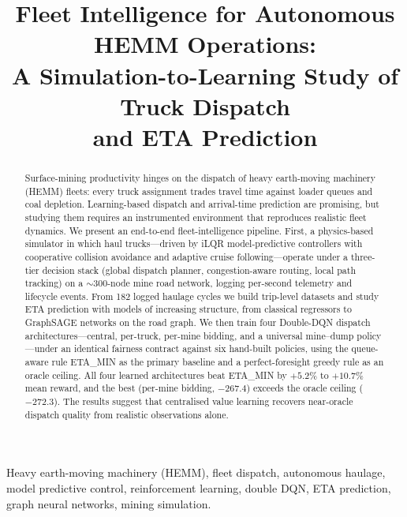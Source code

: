 \documentclass[conference]{IEEEtran}
\title{Fleet Intelligence for Autonomous HEMM Operations:\\
A Simulation-to-Learning Study of Truck Dispatch\\and ETA Prediction}
\author{
\IEEEauthorblockN{Author One\IEEEauthorrefmark{1}, Author Two\IEEEauthorrefmark{2}, Author Three\IEEEauthorrefmark{3}}
\IEEEauthorblockA{\IEEEauthorrefmark{1}Department / Institute, email@example.com}
\IEEEauthorblockA{\IEEEauthorrefmark{2}Department / Institute, email@example.com}
\IEEEauthorblockA{\IEEEauthorrefmark{3}Department / Institute, email@example.com}
}
\begin{document}
\maketitle

\begin{abstract}
Surface-mining productivity hinges on the dispatch of heavy earth-moving
machinery (HEMM) fleets: every truck assignment trades travel time against
loader queues and coal depletion. Learning-based dispatch and arrival-time
prediction are promising, but studying them requires an instrumented
environment that reproduces realistic fleet dynamics. We present an
end-to-end fleet-intelligence pipeline. First, a physics-based simulator in
which haul trucks---driven by iLQR model-predictive controllers with
cooperative collision avoidance and adaptive cruise following---operate
under a three-tier decision stack (global dispatch planner,
congestion-aware routing, local path tracking) on a $\sim$300-node mine
road network, logging per-second telemetry and lifecycle events. From 182
logged haulage cycles we build trip-level datasets and study ETA prediction
with models of increasing structure, from classical regressors to
GraphSAGE networks on the road graph. We then train four Double-DQN
dispatch architectures---central, per-truck, per-mine bidding, and a
universal mine--dump policy---under an identical fairness contract against
six hand-built policies, using the queue-aware rule ETA\_MIN as the primary
baseline and a perfect-foresight greedy rule as an oracle ceiling. All four
learned architectures beat ETA\_MIN by $+5.2\%$ to $+10.7\%$ mean reward,
and the best (per-mine bidding, $-267.4$) exceeds the oracle ceiling
($-272.3$). The results suggest that centralised value learning recovers
near-oracle dispatch quality from realistic observations alone.
\end{abstract}

\begin{IEEEkeywords}
Heavy earth-moving machinery (HEMM), fleet dispatch, autonomous haulage,
model predictive control, reinforcement learning, double DQN,
ETA prediction, graph neural networks, mining simulation.
\end{IEEEkeywords}













\end{document}
